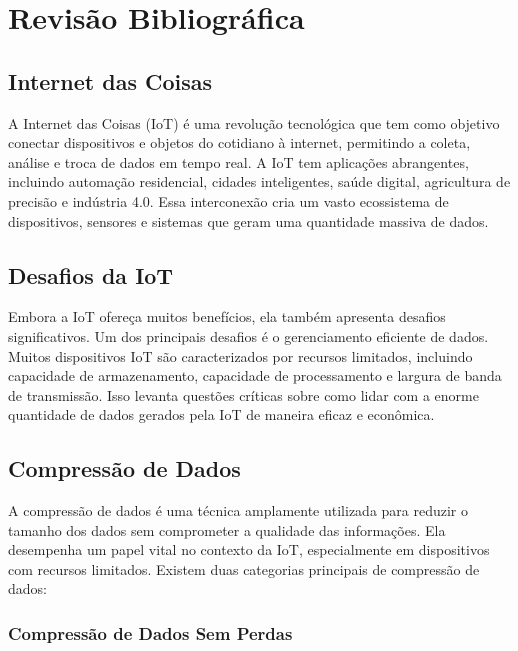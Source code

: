 \chapter{Revisão Bibliográfica}
\label{cap:revisao}

\section{Internet das Coisas}
\label{sec:InternetDasCoisas}

A Internet das Coisas (IoT) é uma revolução tecnológica que tem como objetivo conectar dispositivos e objetos do cotidiano à internet, permitindo a coleta, análise e troca de dados em tempo real. A IoT tem aplicações abrangentes, incluindo automação residencial, cidades inteligentes, saúde digital, agricultura de precisão e indústria 4.0. Essa interconexão cria um vasto ecossistema de dispositivos, sensores e sistemas que geram uma quantidade massiva de dados.

\section{Desafios da IoT}
\label{sec:DesafiosDaIoT}

Embora a IoT ofereça muitos benefícios, ela também apresenta desafios significativos. Um dos principais desafios é o gerenciamento eficiente de dados. Muitos dispositivos IoT são caracterizados por recursos limitados, incluindo capacidade de armazenamento, capacidade de processamento e largura de banda de transmissão. Isso levanta questões críticas sobre como lidar com a enorme quantidade de dados gerados pela IoT de maneira eficaz e econômica.

\section{Compressão de Dados}
\label{sec:CompressãodeDados}

A compressão de dados é uma técnica amplamente utilizada para reduzir o tamanho dos dados sem comprometer a qualidade das informações. Ela desempenha um papel vital no contexto da IoT, especialmente em dispositivos com recursos limitados. Existem duas categorias principais de compressão de dados:

\subsection{Compressão de Dados Sem Perdas}

